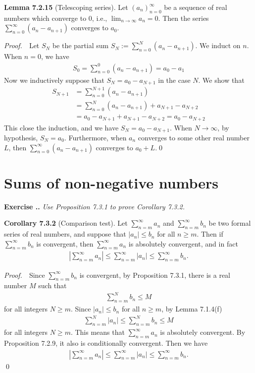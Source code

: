 \documentclass{book}
\newcommand{\pff}{\vspace{.25em}\noindent\emph{Proof.}~~}
\newcommand{\titl}[1]{\noindent\textbf{#1}}
\newcounter{Exercise}[section]
\renewcommand{\theExercise}{\thesection.\arabic{Exercise}.}
\newcommand{\new}{\vspace{1.5em}\noindent\textbf{{Exercise \stepcounter{Exercise}\textbf{\theExercise}}} }
\begin{document}
\begin{framed}
\titl{Lemma 7.2.15} (Telescoping series). Let $(a_n)_{n=0}^{\infty}$ be a sequence of real numbers which converge to $0$, i.e., $\lim_{n\to\infty}a_n=0$. Then the series $\sum_{n=0}^{\infty}(a_n-a_{n+1})$ converges to $a_0$.
\end{framed}

\pff Let $S_N$ be the partial sum $S_N:=\sum_{n=0}^{N}(a_n-a_{n+1})$. We induct on $n$. When $n=0$, we have
    \begin{align*}
        S_0=\sum_{n=0}^{0}(a_n-a_{n+1})=a_0-a_1
    \end{align*}
Now we inductively suppose that $S_N=a_0-a_{N+1}$ in the case $N$. We show that
    \begin{align*}
        S_{N+1}&=\sum_{n=0}^{N+1}(a_n-a_{n+1})\\
        &=\sum_{n=0}^{N}(a_n-a_{n+1})+a_{N+1}-a_{N+2}\\
        &=a_0-a_{N+1}+a_{N+1}-a_{N+2}=a_0-a_{N+2}
    \end{align*}
This close the induction, and we have $S_N=a_0-a_{N+1}$. When $N\to\infty$, by hypothesis, $S_N=a_0$. Furthermore, when $a_n$ converges to some other real number $L$, then $\sum_{n=0}^\infty(a_n-a_{n+1})$ converges to $a_0+L$.\qed

\section{Sums of non-negative numbers}

\new\emph{Use Proposition 7.3.1 to prove Corollary 7.3.2.}

\begin{framed}
\titl{Corollary 7.3.2} (Comparison test). Let $\sum_{n=m}^{\infty}a_n$ and $\sum_{n=m}^{\infty}b_n$ be two formal series of real numbers, and suppose that $|a_n|\leq b_n$ for all $n\geq m$. Then if $\sum_{n=m}^{\infty}b_n$ is convergent, then $\sum_{n=m}^{\infty}a_n$ is absolutely convergent, and in fact
    \begin{align*}
        \left|\sum_{n=m}^{\infty}a_n\right|\leq\sum_{n=m}^{\infty}|a_n|\leq\sum_{n=m}^{\infty}b_n.
    \end{align*}
\end{framed}

\pff Since $\sum_{n=m}^\infty b_n$ is convergent, by Proposition 7.3.1, there is a real number $M$ such that
    \begin{align*}
        \sum_{n=m}^{N}b_n\leq M
    \end{align*}
for all integers $N\geq m$. Since $|a_n|\leq b_n$ for all $n\geq m$, by Lemma 7.1.4(f)
    \begin{align*}
        \sum_{n=m}^{N}|a_n|\leq\sum_{n=m}^{N}b_n\leq M
    \end{align*}
for all integers $N\geq m$. This means that $\sum_{n=m}^{\infty}a_n$ is absolutely convergent. By Proposition 7.2.9, it also is conditionally convergent. Then we have
    \begin{align*}
        \left|\sum_{n=m}^{\infty}a_n\right|\leq\sum_{n=m}^{\infty}|a_n|\leq\sum_{n=m}^{\infty}b_n.
    \end{align*}\qed
\end{document}
